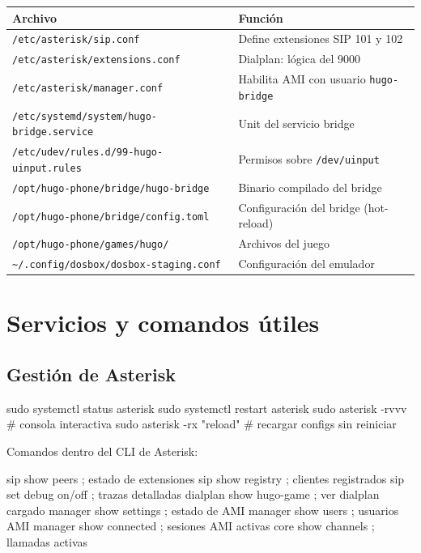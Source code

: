 \begin{table}[h]
\centering
\small
\begin{tabular}{p{} p{}}
\toprule
\textbf{Archivo} & \textbf{Función} \\
\midrule
\texttt{/etc/asterisk/sip.conf} & Define extensiones SIP 101 y 102 \\
\texttt{/etc/asterisk/extensions.conf} & Dialplan: lógica del 9000 \\
\texttt{/etc/asterisk/manager.conf} & Habilita AMI con usuario \texttt{hugo-bridge} \\
\texttt{/etc/systemd/system/hugo-bridge.service} & Unit del servicio bridge \\
\texttt{/etc/udev/rules.d/99-hugo-uinput.rules} & Permisos sobre \texttt{/dev/uinput} \\
\texttt{/opt/hugo-phone/bridge/hugo-bridge} & Binario compilado del bridge \\
\texttt{/opt/hugo-phone/bridge/config.toml} & Configuración del bridge (hot-reload) \\
\texttt{/opt/hugo-phone/games/hugo/} & Archivos del juego \\
\texttt{\textasciitilde/.config/dosbox/dosbox-staging.conf} & Configuración del emulador \\
\bottomrule
\end{tabular}
\end{table}

\section{Servicios y comandos útiles}

\subsection{Gestión de Asterisk}

\begin{shellcode}
sudo systemctl status asterisk
sudo systemctl restart asterisk
sudo asterisk -rvvv               # consola interactiva
sudo asterisk -rx "reload"        # recargar configs sin reiniciar
\end{shellcode}

Comandos dentro del CLI de Asterisk:

\begin{plaincode}
sip show peers              ; estado de extensiones
sip show registry           ; clientes registrados
sip set debug on/off        ; trazas detalladas
dialplan show hugo-game     ; ver dialplan cargado
manager show settings       ; estado de AMI
manager show users          ; usuarios AMI
manager show connected      ; sesiones AMI activas
core show channels          ; llamadas activas
\end{plaincode}


